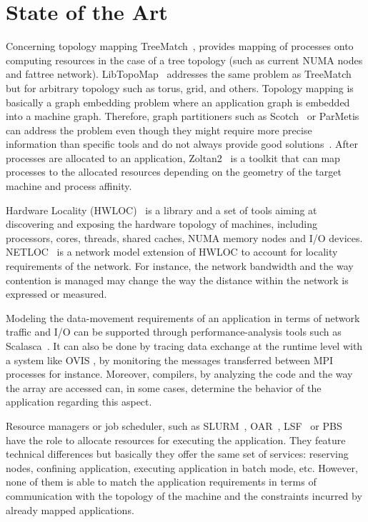 \section{State of the Art}
Concerning topology mapping TreeMatch~\cite{jmt14b}, provides mapping
of processes onto computing resources in the case of a tree topology (such as
current NUMA nodes and fattree
network). LibTopoMap~\cite{DBLP:conf/ics/HoeflerS11} addresses the same problem as
TreeMatch but for arbitrary topology such as torus, grid, and others. Topology mapping is basically a graph embedding problem 
where an application graph is embedded into a machine graph.  Therefore, graph partitioners 
such as Scotch~\cite{scotch-man} or ParMetis~\cite{karypis2003parmetis} can address the
problem even though they might require more precise information than specific
tools and do not always provide good solutions~\cite{jmt14b}.  
After processes are allocated to an application, Zoltan2~\cite{zoltan2,drl+14} is a 
toolkit that can map processes to the allocated resources depending on the geometry of the 
target machine and process affinity.


Hardware Locality (HWLOC)~\cite{hwloc} is a library and a set of tools aiming at
discovering and exposing the hardware topology of machines, including
processors, cores, threads, shared caches, NUMA memory nodes and I/O devices.
NETLOC~\cite{netloc} is a network model extension of HWLOC to account for locality
requirements of the network. For instance, the network bandwidth and the way
contention is managed may change the way the distance within the network is
expressed or measured. 

Modeling the data-movement requirements of an application in terms of
network traffic and I/O can be supported through performance-analysis tools
such as Scalasca~\cite{geimer_ea:2010:scalascaarchitecture}. It can also be done
by tracing data exchange at the runtime level with a system like OVIS \cite{SystemMonitoring,ovis}, by monitoring the
messages transferred between MPI processes for instance. Moreover, compilers, by analyzing
the code and the way the array are accessed can, in some cases, determine the
behavior of the application regarding this aspect. 

Resource managers or job scheduler, such as SLURM~\cite{yoo2003slurm},
OAR~\cite{capit2005batch,}, LSF~\cite{zhou1992lsf}
or PBS~\cite{henderson1995job} have the role to allocate resources for executing the
application. They feature technical differences but basically they offer the
same set of services: reserving nodes, confining application, executing
application in batch mode, etc. However, none of them is able to match the
application requirements in terms of communication with the topology of the
machine and the constraints incurred by already mapped applications. 


